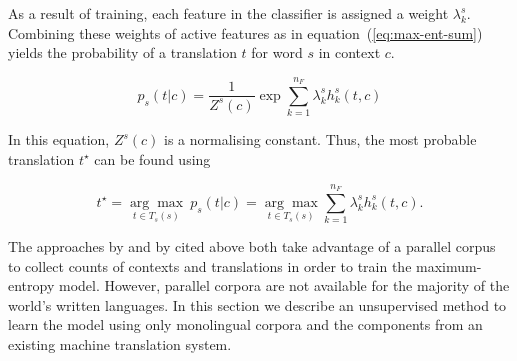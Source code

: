 \documentclass[11pt]{article}
\begin{document}
As a result of training, each feature in the classifier is assigned a
weight $\lambda_k^s$. Combining these weights of active features
as in equation~(\ref{eq:max-ent-sum}) yields the probability of a
translation $t$ for word $s$ in context $c$.

\begin{equation}
p_s(t|c) = \frac{1}{Z^s(c)} \exp{ \sum_{k=1}^{n_F} \lambda_k^s h_k^s(t, c)}
\label{eq:max-ent-sum}
\end{equation}

In this equation, $Z^s(c)$ is a normalising constant. Thus, the most
probable translation \(t^\star\) can be found using

\begin{equation}
  t^\star=\underset{t \in T_s(s)}{\arg\max} ~ p_s(t|c) = \underset{t \in T_s(s)}{\arg\max} \sum_{k=1}^{n_F} \lambda_k^s h_k^s(t, c) .
\label{eq:max-ent-max}
\end{equation}


The approaches by \cite{berger1996} and by \cite{marechek10} cited
above both take advantage of a parallel corpus to collect counts of
contexts and translations in order to train the maximum-entropy
model. However, parallel corpora are not available for the majority of
the world's written languages. In this section we describe an
unsupervised method to learn the model using only monolingual corpora
and the components from an existing machine translation system.
\end{document}
